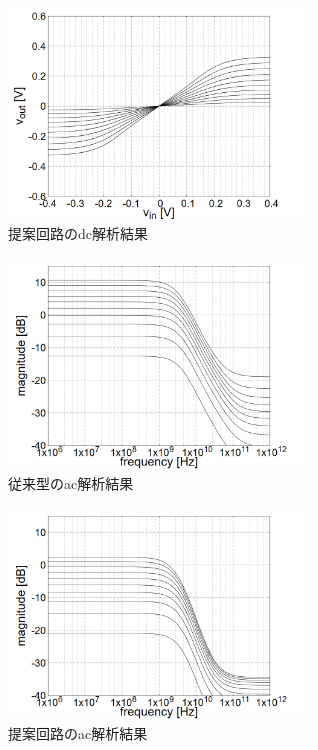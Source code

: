 \documentclass[twocolumn]{jsarticle}
\begin{document}
    \begin{figure}[h]
        \begin{center}
            \includegraphics*[width = 80mm]{figures/NtoN_dc_monochrome.PNG}
            \caption{提案回路のdc解析結果}
            \label{fig:sim_NtoN_dc}
        \end{center}
    \end{figure}
    \newpage
    \begin{figure}[h]
        \begin{center}
            \includegraphics*[width = 80mm]{figures/previous_ac_monochrome.PNG}
            \caption{従来型のac解析結果}
            \label{fig:sim_previous_ac}
        \end{center}
    \end{figure}
    \begin{figure}[h]
        \begin{center}
            \includegraphics*[width = 80mm]{figures/NtoN_ac_monochrome.PNG}
            \caption{提案回路のac解析結果}
            \label{fig:sim_NtoN_ac}
        \end{center}
    \end{figure}
\end{document}
